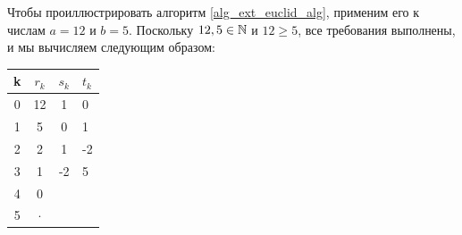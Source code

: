 \begin{example}
\label{example:extended_Euclidean_division_1}
Чтобы проиллюстрировать алгоритм \ref{alg_ext_euclid_alg}, применим его к числам $a=12$ и $b=5$. Поскольку $12,5\in \mathbb{N}$ и $12\geq 5$, все требования выполнены, и мы вычисляем следующим образом:
\begin{center}
  \begin{tabular}{c | c c l}
    k & $ r_k $ & $ s_k $ & $ t_k $ \\\hline
    0 & 12 & 1 & 0 \\
    1 & 5 & 0 & 1 \\
    2 & 2 & 1 & -2 \\
    3 & 1 & -2 & 5 \\
    4 & 0 &  &  \\
    5 & $\cdot$ &&\\
  \end{tabular}
  \end{center}

  

\end{example}

